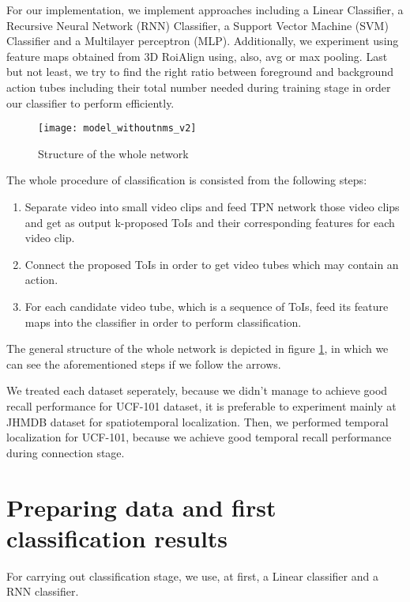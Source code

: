 For our implementation, we implement approaches including a Linear Classifier, 
a Recursive Neural Network (RNN) Classifier, a Support Vector Machine (SVM) Classifier and a Multilayer perceptron (MLP).
Additionally, we experiment using feature maps obtained from 3D RoiAlign using, also, avg or max pooling. Last but not least, we try to
find the right ratio between foreground and background action tubes including their total number needed during training stage
in order our classifier to perform efficiently.

\begin{figure}[h]
  \centering
  \texttt{[image: model\_withoutnms\_v2]}
  \caption{Structure of the whole network}
  \label{fig:whole_network}
\end{figure}

The whole procedure of classification is consisted from the following steps:
\begin{enumerate}
\item Separate video into small video clips and feed TPN network those video clips and get as output
  k-proposed ToIs and their corresponding features for each video clip.
\item Connect the proposed ToIs in order to get video tubes which may contain an action.
\item For each candidate video tube, which is a sequence of ToIs, feed its feature maps  into the classifier
  in order to perform classification.
\end{enumerate}

The general structure of the whole network is depicted in figure \ref{fig:whole_network}, in which we can see the aforementioned steps if we
follow the arrows.  \par
We treated each dataset seperately, because we didn't manage to achieve good recall performance for UCF-101 dataset, it is preferable to
experiment mainly at JHMDB dataset for spatiotemporal localization. Then, we performed temporal localization for UCF-101, because we achieve
good temporal recall performance during connection stage.

\section{Preparing data  and first classification results}

For carrying out classification stage, we use, at first, a Linear classifier and a RNN classifier.
